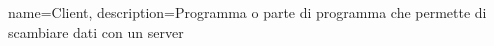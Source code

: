 {
    name={Client},
    description={Programma o parte di programma che permette di scambiare dati con un server}
}